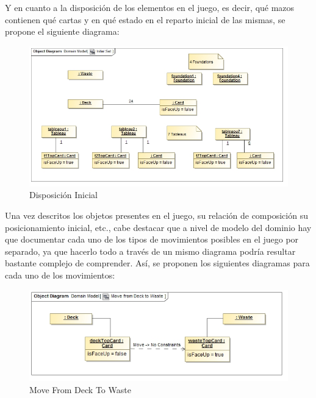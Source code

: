 \documentclass[11pt]{article}
\begin{document}
Y en cuanto a la disposición de los elementos en el juego, es decir, qué mazos contienen qué cartas y en qué estado en el reparto inicial de las mismas, se propone el siguiente diagrama:

\begin{center}
 \begin{figure}[H]
 \begin{center}
   \includegraphics[width=16cm]{DomainModel/InitialSet00.jpg}
   \caption{Disposición Inicial}
   \label{fig:initialset}
 \end{center}
 \end{figure}
\end{center}

Una vez descritos los objetos presentes en el juego, su relación de composición su posicionamiento inicial, etc., cabe destacar que a nivel de modelo del dominio hay que documentar cada uno de los tipos de movimientos posibles en el juego por separado, ya que hacerlo todo a través de un mismo diagrama podría resultar bastante complejo de comprender. Así, se proponen los siguientes diagramas para cada uno de los movimientos:

\begin{center}
 \begin{figure}[H]
 \begin{center}
   \includegraphics[width=15cm]{DomainModel/MoveFromDeckToWaste00.jpg}
   \caption{Move From Deck To Waste}
   \label{fig:deck2waste}
 \end{center}
 \end{figure}
\end{center}
\end{document}
